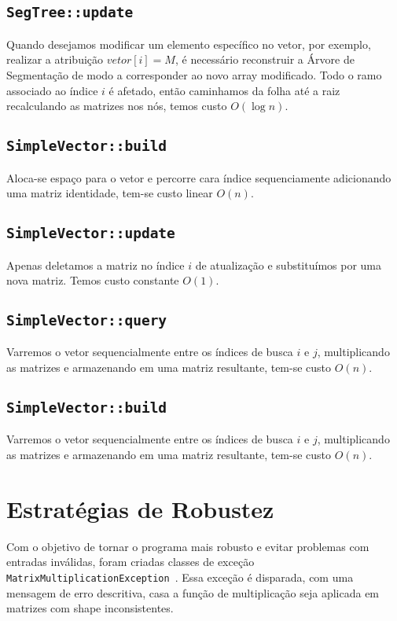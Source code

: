 \documentclass{article}
\begin{document}
\subsection{\texttt{SegTree::update}}

Quando desejamos modificar um elemento específico no vetor, por exemplo, realizar a atribuição \(vetor[i] = M\), é necessário reconstruir a Árvore de Segmentação de modo a corresponder ao novo array modificado. Todo o ramo associado ao índice $i$ é afetado, então caminhamos da folha até a raiz recalculando as matrizes nos nós, temos custo  \(O(\log n)\).

\subsection{\texttt{SimpleVector::build}}
Aloca-se espaço para o vetor e percorre cara índice sequenciamente adicionando uma matriz identidade, tem-se custo linear \(O(n)\).

\subsection{\texttt{SimpleVector::update}}
Apenas deletamos a matriz no índice $i$ de atualização e substituímos por uma nova matriz. Temos custo constante  \(O(1)\).

\subsection{\texttt{SimpleVector::query}}
Varremos o vetor sequencialmente entre os índices de busca $i$ e $j$, multiplicando as matrizes e armazenando em uma matriz resultante, tem-se custo  \(O(n)\).

\subsection{\texttt{SimpleVector::build}}
Varremos o vetor sequencialmente entre os índices de busca $i$ e $j$, multiplicando as matrizes e armazenando em uma matriz resultante, tem-se custo  \(O(n)\).




\section{Estratégias de Robustez}
Com o objetivo de tornar o programa mais robusto e evitar problemas com entradas inválidas, foram criadas classes de exceção \texttt{MatrixMultiplicationException }. Essa exceção é disparada, com uma mensagem de erro descritiva, casa a função de multiplicação seja aplicada em matrizes com shape inconsistentes.
\end{document}
